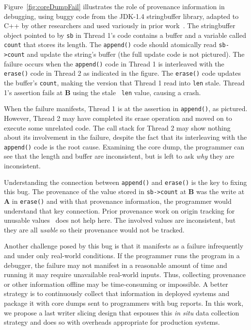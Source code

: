 \documentclass[preprint,9pt]{sigplanconf}
\begin{document}
Figure~\ref{fig:coreDumpFail} illustrates the role of provenance information in
debugging, using buggy code from the JDK-1.4 stringbuffer library, adapted to
C++ by other researchers and used variously in prior
work~\cite{concurrencybugs}.  The stringbuffer object pointed to by {\tt sb} in
Thread 1's code contains a buffer and a variable called {\tt count} that stores
its length.  The {\tt append()} code should atomically read {\tt sb->count} and
update the string's buffer (the full update code is not pictured).  The failure
occurs when the {\tt append()} code in Thread 1 is interleaved with the {\tt
erase()} code in Thread 2 as indicated in the figure.  The {\tt erase()} code
updates the buffer's {\tt count}, making the version that Thread 1 read into
{\tt len} stale.  Thread 1's assertion fails at {\bf B} using the stale {\tt
len} value, causing a crash.  

When the failure manifests, Thread 1 is at the assertion in {\tt append()}, as
pictured.  However, Thread 2 may have completed its erase operation and moved on
to execute some unrelated code.  The call stack for Thread 2 may show nothing
about its involvement in the failure, despite the fact that its interleaving
with the {\tt append()} code is the root cause.  Examining the core dump, the
programmer can see that the length and buffer are inconsistent, but is left to
ask {\em why} they are inconsistent.  

Understanding the connection between {\tt append()} and {\tt erase()} is the
key to fixing this bug.  The provenance of the value stored in {\tt sb->count}
at {\bf B} was the write at {\bf A} in {\tt erase()} and with that provenance
information, the programmer would understand that key connection.  Prior
provenance work on origin tracking for unusable values~\cite{badapples} does
not help here.  The involved values are inconsistent, but they are all {\em
usable} so their provenance would not be tracked.   

Another challenge posed by this bug is that it manifests as a failure
infrequently and under only real-world conditions.  If the programmer runs the
program in a debugger, the failure may not manifest in a reasonable amount of
time and running it may require unavailable real-world inputs.  Thus,
collecting provenance or other information offline may be time-consuming or
impossible.  A better strategy is to continuously collect that information in
deployed systems and package it with core dumps sent to programmers with bug
reports.  In this work, we propose a last writer slicing design that espouses
this {\em in situ} data collection strategy and does so with overheads
appropriate for production systems.
\end{document}
